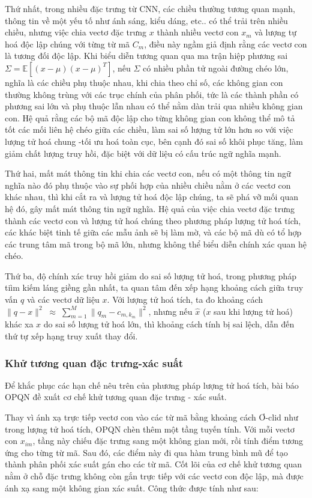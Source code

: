 Thứ nhất, trong nhiều đặc trưng từ CNN, các chiều thường tương quan mạnh, thông tin về một yếu tố như ánh sáng, kiểu dáng, etc.. có thể trải trên nhiều chiều, nhưng việc chia vectơ đặc trưng $x$ thành nhiều vectơ con $x_m$ và lượng tự hoá độc lập chúng với từng từ mã $C_m$, điều này ngầm giả định rằng các vectơ con là tương đối độc lập. Khi biểu diễn tương quan qua ma trận hiệp phương sai $\Sigma = \mathbb{E}[(x-\mu)(x-\mu)^T]$, nếu $\Sigma$ có nhiều phần tử ngoài đường chéo lớn, nghĩa là các chiều phụ thuộc nhau, khi chia theo chỉ số, các không gian con thường không trùng với các trục chính của phân phối, tức là các thành phần có phương sai lớn và phụ thuộc lẫn nhau có thể nằm dàn trải qua nhiều không gian con. Hệ quả rằng các bộ mã độc lập cho từng không gian con không thể mô tả tốt các mối liên hệ chéo giữa các chiều, làm sai số lượng tử lớn hơn so với việc lượng tử hoá chung -tối ưu hoá toàn cục, bên cạnh đó sai số khôi phục tăng, làm giảm chất lượng truy hồi, đặc biệt với dữ liệu có cấu trúc ngữ nghĩa mạnh. 

Thứ hai, mất mát thông tin khi chia các vectơ con, nếu có một thông tin ngữ nghĩa nào đó phụ thuộc vào sự phối hợp của nhiều chiều nằm ở các vectơ con khác nhau, thì khi cắt ra và lượng tử hoá độc lập chúng, ta sẽ phá vỡ mối quan hệ đó, gây mất mát thông tin ngữ nghĩa. Hệ quả của việc chia vectơ đặc trưng thành các vectơ con và lượng tử hoá chúng theo phương pháp lượng tử hoá tích, các khác biệt tinh tế giữa các mẫu ảnh sẽ bị làm mờ, và các bộ mã dù có tổ hợp các trung tâm mã trong bộ mã lớn, nhưng không thể biểu diễn chính xác quan hệ chéo.

Thứ ba, độ chính xác truy hồi giảm do sai số lượng tử hoá, trong phương pháp tiìm kiếm láng giềng gần nhất, ta quan tâm đến xếp hạng khoảng cách giữa truy vấn $q$ và các vectơ dữ liệu $x$. Với lượng tử hoá tích, ta đo khoảng cách $\|q - x\|^2 \;\approx\; \sum_{m=1}^M \|q_m - c_{m,k_m}\|^2$, nhưng nếu $\hat{x}$ ($x$ sau khi lượng tử hoá) khác xa $x$ do sai số lượng tử hoá lớn, thì khoảng cách tính bị sai lệch, dẫn đến thứ tự xếp hạng truy xuất thay đổi.

\subsubsection{Khử tương quan đặc trưng-xác suất}
Để khắc phục các hạn chế nêu trên của phương pháp lượng tử hoá tích, bài báo OPQN đề xuất cơ chế khử tương quan đặc trưng - xác suất.

Thay vì ánh xạ trực tiếp vectơ con vào các từ mã bằng khoảng cách Ơ-clid như trong lượng tử hoá tích, OPQN chèn thêm một tầng tuyến tính. Với mỗi vectơ con $x_{im}$, tầng này chiếu đặc trưng sang một không gian mới, rồi tính điểm tương ứng cho từng từ mã. Sau đó, các điểm này đi qua hàm trung bình mũ để tạo thành phân phối xác suất gán cho các từ mã. Cốt lõi của cơ chế khử tương quan nằm ở chỗ đặc trưng không còn gắn trực tiếp với các vectơ con độc lập, mà được ánh xạ sang một không gian xác suất. Công thức được tính như sau:


